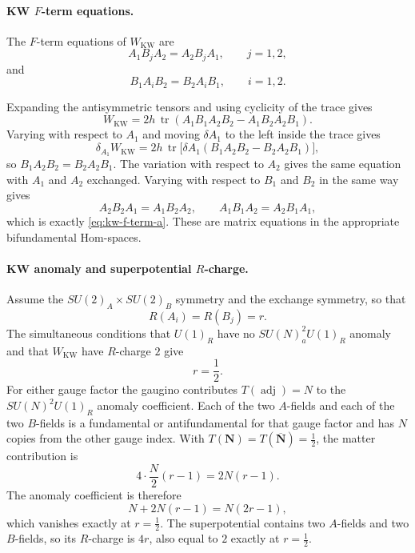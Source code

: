 \paragraph{KW \(F\)-term equations.}
The \(F\)-term equations of \(W_{\mathrm{KW}}\) are
\begin{equation}
  A_1B_jA_2=A_2B_jA_1,\qquad j=1,2,
  \label{eq:kw-f-term-a}
\end{equation}
and
\begin{equation}
  B_1A_iB_2=B_2A_iB_1,\qquad i=1,2 .
  \label{eq:kw-f-term-b}
\end{equation}

Expanding the antisymmetric tensors and using cyclicity of the trace gives
\[
  W_{\mathrm{KW}}
  =
  2h\,\operatorname{tr}(A_1B_1A_2B_2-A_1B_2A_2B_1).
\]
Varying with respect to \(A_1\) and moving \(\delta A_1\) to the left inside
the trace gives
\[
  \delta_{A_1}W_{\mathrm{KW}}
  =
  2h\,\operatorname{tr}\bigl[
    \delta A_1(B_1A_2B_2-B_2A_2B_1)
  \bigr],
\]
so \(B_1A_2B_2=B_2A_2B_1\).  The variation with respect to \(A_2\) gives the
same equation with \(A_1\) and \(A_2\) exchanged.  Varying with respect to
\(B_1\) and \(B_2\) in the same way gives
\[
  A_2B_2A_1=A_1B_2A_2,\qquad
  A_1B_1A_2=A_2B_1A_1,
\]
which is exactly \eqref{eq:kw-f-term-a}.  These are matrix equations in the
appropriate bifundamental Hom-spaces.

\paragraph{KW anomaly and superpotential \(R\)-charge.}
Assume the \(SU(2)_A\times SU(2)_B\) symmetry and the exchange symmetry, so
that
\[
  R(A_i)=R(B_j)=r .
\]
The simultaneous conditions that \(U(1)_R\) have no \(SU(N)_a^2U(1)_R\)
anomaly and that \(W_{\mathrm{KW}}\) have \(R\)-charge \(2\) give
\[
  r=\frac12 .
\]
For either gauge factor the gaugino contributes \(T(\operatorname{adj})=N\)
to the \(SU(N)^2U(1)_R\) anomaly coefficient.  Each of the two \(A\)-fields
and each of the two \(B\)-fields is a fundamental or antifundamental for that
gauge factor and has \(N\) copies from the other gauge index.  With
\(T(\mathbf N)=T(\overline{\mathbf N})=\frac12\), the matter contribution is
\[
  4\cdot \frac{N}{2}(r-1)=2N(r-1).
\]
The anomaly coefficient is therefore
\[
  N+2N(r-1)=N(2r-1),
\]
which vanishes exactly at \(r=\frac12\).  The superpotential contains two
\(A\)-fields and two \(B\)-fields, so its \(R\)-charge is \(4r\), also equal
to \(2\) exactly at \(r=\frac12\).

